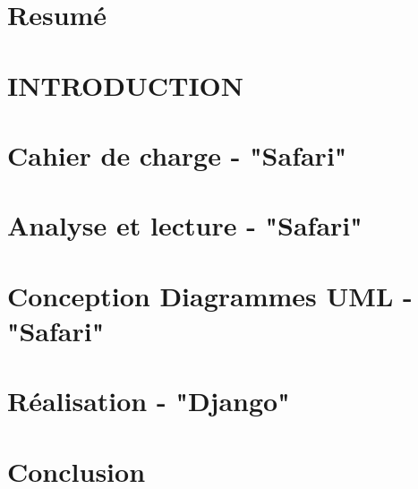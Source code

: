 \documentclass[a4paper, oneside, 12pt, final]{extreport}
\begin{document}

\tableofcontents

\listoffigures
\listoftables

\cleardoublepage

\newpage
{}
\chapter*{Resumé}
\label{chap:general_intorduction}



\chapter{ INTRODUCTION }%
\label{chap1:chapterone}


\chapter{ Cahier de charge - "Safari"  }%
\label{chap2:chapterone}






\chapter{ Analyse et lecture - "Safari"  }%
\label{chap:3}

\label{chap3:general_intorduction}


\chapter{Conception Diagrammes UML - "Safari"  }%
\label{chap4:introduction}
 


\chapter{Réalisation - "Django"  }%
\label{chap5:introduction}
 

\label{chap:conclusion}

\chapter*{Conclusion}
\label{chap:conclusion}
 
\end{document}
